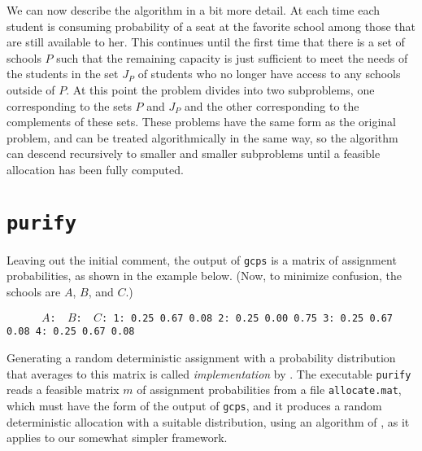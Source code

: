 \documentclass[12pt]{article}
\theoremstyle{definition}
\begin{document}
We can now describe the algorithm in a bit more detail.  At each time
each student is consuming probability of a seat at the favorite school
among those that are still available to her.  This continues until the
first time that there is a set of schools $P$ such that the remaining
capacity is just sufficient to meet the needs of the students in the
set $J_P$ of students who no longer have access to any schools outside
of $P$.  At this point the problem divides into two subproblems, one
corresponding to the sets $P$ and $J_P$ and the other corresponding to
the complements of these sets.  These problems have the same form as
the original problem, and can be treated algorithmically in the same
way, so the algorithm can descend recursively to smaller and smaller
subproblems until a feasible allocation has been fully computed.


\section{\texttt{purify}} \label{sec:Implementation}

Leaving out the initial comment, the output of \texttt{gcps} is a
matrix of assignment probabilities, as shown in the example below.
(Now, to minimize confusion, the schools are $A$, $B$, and $C$.)

\begin{obeylines}\texttt{
\ \ \ \ \ $A$:    \     $B$:  \      $C$:
1:      0.25     0.67     0.08
2:      0.25     0.00     0.75
3:      0.25     0.67     0.08
4:      0.25     0.67     0.08
}
\end{obeylines} \noindent

\medskip
Generating a random deterministic assignment with a probability
distribution that averages to this matrix is called
\emph{implementation} by \cite{bckm13aer}.  The executable
\texttt{purify} reads a feasible matrix $m$ of assignment
probabilities from a file \texttt{allocate.mat}, which must have the
form of the output of \texttt{gcps}, and it produces a random
deterministic allocation with a suitable distribution, using an
algorithm of \cite{bckm13aer}, as it applies to our somewhat simpler
framework.
\end{document}

